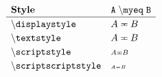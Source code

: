 \documentclass[varwidth, border = 3pt]{standalone}
\newcommand{\test}%
           {A \myeq B}
\newcommand{\verbtest}%
           {A \mathmacro{myeq} B}
\newcommand{\testmathstyle}{
    \[
        \renewcommand{\arraystretch}{1.2}%
        \begin{array}{lll}
              \textbf{Style}
            & \mathtt{\verbtest}
            \\ \hline
              \mathtt{\backslash displaystyle}
            & \displaystyle \test
            \\
              \mathtt{\backslash textstyle}
            & \textstyle \test
            \\
              \mathtt{\backslash scriptstyle}
            & \scriptstyle \test
            \\
              \mathtt{\backslash scriptscriptstyle}
            & \scriptscriptstyle \test
        \end{array}
    \]
}
\begin{document}
\testmathstyle
\end{document}
